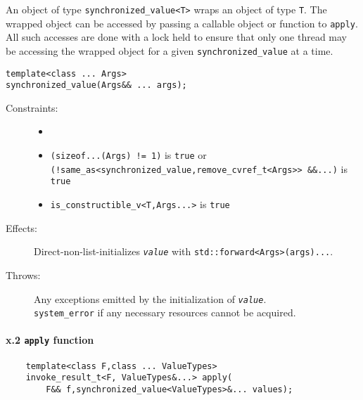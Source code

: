 An object of type \texttt{synchronized\_value\textless{}T\textgreater{}}
wraps an object of type \texttt{T}. The wrapped object can be accessed
by passing a callable object or function to \texttt{apply}. All such
accesses are done with a lock held to ensure that only one thread may be
accessing the wrapped object for a given \texttt{synchronized\_value} at
a time.

\begin{verbatim}
template<class ... Args>
synchronized_value(Args&& ... args);
\end{verbatim}

\begin{description}
\item[Constraints:]
\begin{itemize}
\tightlist
\item[]
\item
  \texttt{(sizeof...(Args)\ !=\ 1)} is \texttt{true} or
  \texttt{(!same\_as\textless{}synchronized\_value,remove\_cvref\_t\textless{}Args\textgreater{}\textgreater{}\ \&\&...)}
  is \texttt{true}
\item
  \texttt{is\_constructible\_v\textless{}T,Args...\textgreater{}} is
  \texttt{true}
\end{itemize}
\item[Effects:]
Direct-non-list-initializes \emph{\texttt{value}} with
\texttt{std::forward\textless{}Args\textgreater{}(args)...}.
\item[Throws:]
Any exceptions emitted by the initialization of \emph{\texttt{value}}.\\
\texttt{system\_error} if any necessary resources cannot be acquired.
\end{description}

\mbox{}%
\hypertarget{x.2-apply-function}{%
\paragraph{\texorpdfstring{x.2 \texttt{apply}
function}{x.2 apply function}}\label{x.2-apply-function}}

\begin{verbatim}
    template<class F,class ... ValueTypes>
    invoke_result_t<F, ValueTypes&...> apply(
        F&& f,synchronized_value<ValueTypes>&... values);
\end{verbatim}

